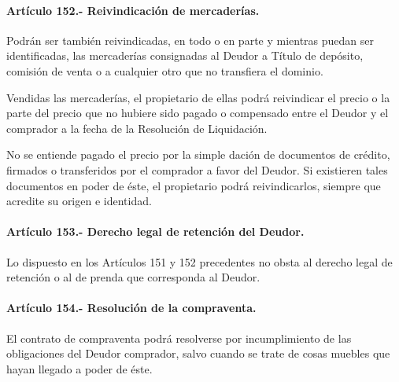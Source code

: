 \documentclass[
]{book}
\begin{document}
\hypertarget{artuxedculo-152.--reivindicaciuxf3n-de-mercaderuxedas.}{%
\paragraph*{Artículo 152.- Reivindicación de mercaderías.}\label{artuxedculo-152.--reivindicaciuxf3n-de-mercaderuxedas.}}

Podrán ser también reivindicadas, en todo o en parte y mientras puedan ser identificadas, las mercaderías consignadas al Deudor a Título de depósito, comisión de venta o a cualquier otro que no transfiera el dominio.

Vendidas las mercaderías, el propietario de ellas podrá reivindicar el precio o la parte del precio que no hubiere sido pagado o compensado entre el Deudor y el comprador a la fecha de la Resolución de Liquidación.

No se entiende pagado el precio por la simple dación de documentos de crédito, firmados o transferidos por el comprador a favor del Deudor. Si existieren tales documentos en poder de éste, el propietario podrá reivindicarlos, siempre que acredite su origen e identidad.

\hypertarget{artuxedculo-153.--derecho-legal-de-retenciuxf3n-del-deudor.}{%
\paragraph*{Artículo 153.- Derecho legal de retención del Deudor.}\label{artuxedculo-153.--derecho-legal-de-retenciuxf3n-del-deudor.}}

Lo dispuesto en los Artículos 151 y 152 precedentes no obsta al derecho legal de retención o al de prenda que corresponda al Deudor.

\hypertarget{artuxedculo-154.--resoluciuxf3n-de-la-compraventa.}{%
\paragraph*{Artículo 154.- Resolución de la compraventa.}\label{artuxedculo-154.--resoluciuxf3n-de-la-compraventa.}}

El contrato de compraventa podrá resolverse por incumplimiento de las obligaciones del Deudor comprador, salvo cuando se trate de cosas muebles que hayan llegado a poder de éste.
\end{document}
